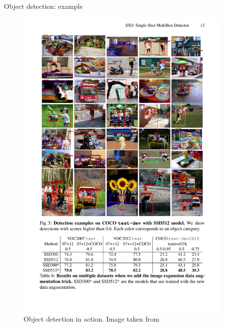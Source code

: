 \documentclass[xcolor=pdftex,dvipsnames,table]{beamer}
\begin{document}
\begin{frame}{Object detection: example}
\begin{figure}[htb]
   \centering
   \includegraphics[width=0.95\textwidth]{../graphics/Detection_example1.pdf}
   \caption{Object detection in action. Image taken from \cite{Liu2016}}
\end{figure}
\end{frame}
\end{document}

